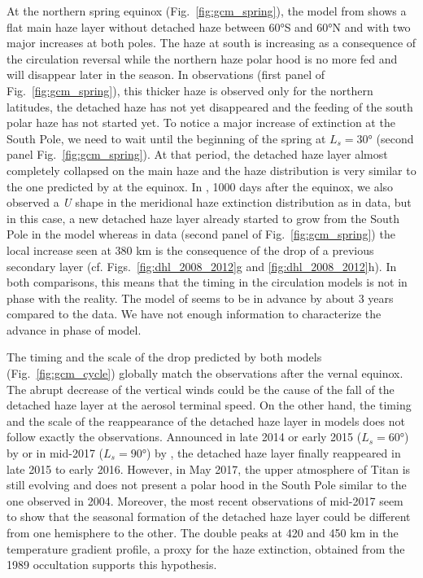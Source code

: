 At the northern spring equinox (Fig.~\ref{fig:gcm_spring}), the model from \cite{Lebonnois2012} shows a
flat main haze layer without detached haze between \ang{60}S and \ang{60}N and with two major increases at both poles. The
haze at south is increasing as a consequence of the circulation reversal while the northern haze polar hood is no more fed
and will disappear later in the season. In observations (first panel of Fig.~\ref{fig:gcm_spring}),
this thicker haze is observed only for the northern latitudes, the detached haze has not yet disappeared
and the feeding of the south polar haze has not started yet. To notice a major increase of extinction at the South Pole,
we need to wait until the beginning of the spring at $L_s = \ang{30}$ (second panel Fig.~\ref{fig:gcm_spring}).
At that period, the detached haze layer almost completely collapsed on the main haze and the haze distribution is very
similar to the one predicted by \cite{Lebonnois2012} at the equinox. In \cite{Larson2015}, 1000 days after the equinox,
we also observed a \emph{U} shape in the meridional haze extinction distribution as in data, but in this case, a new detached haze layer already
started to grow from the South Pole in the model whereas in data (second panel  of Fig.~\ref{fig:gcm_spring}) the local
increase seen at 380 km is the consequence of the drop of a previous secondary layer (cf. Figs.~\ref{fig:dhl_2008_2012}g
and \ref{fig:dhl_2008_2012}h). In both comparisons, this means that the timing in the circulation models is not in
phase with the reality. The model of \cite{Lebonnois2012} seems to be in advance by about 3 years compared to the data.
We have not enough information to characterize the advance in phase of \cite{Larson2015} model.

The timing and the scale of the drop predicted by both models (Fig.~\ref{fig:gcm_cycle}) globally match
the observations after the vernal equinox. The abrupt decrease of the vertical winds could be the cause of the fall of
the detached haze layer at the aerosol terminal speed. On the other hand, the timing and the scale of the reappearance
of the detached haze layer in models does not follow exactly the observations. Announced in late 2014 or early 2015
($L_s = \ang{60}$) by \cite{Larson2015} or in mid-2017 ($L_s = \ang{90}$) by \cite{Lebonnois2012}, the detached haze layer
finally reappeared in late 2015 to early 2016.
However, in May 2017, the upper atmosphere of Titan is still evolving and does not present a polar hood in the South Pole
similar to the one observed in 2004. Moreover, the most recent observations of mid-2017 seem to show that the seasonal
formation of the detached haze layer could be different from one hemisphere to the other. The double peaks at
420 and 450 km in the temperature gradient profile, a proxy for the haze extinction, obtained from the 1989
occultation \citep{Sicardy1999} supports this hypothesis.

